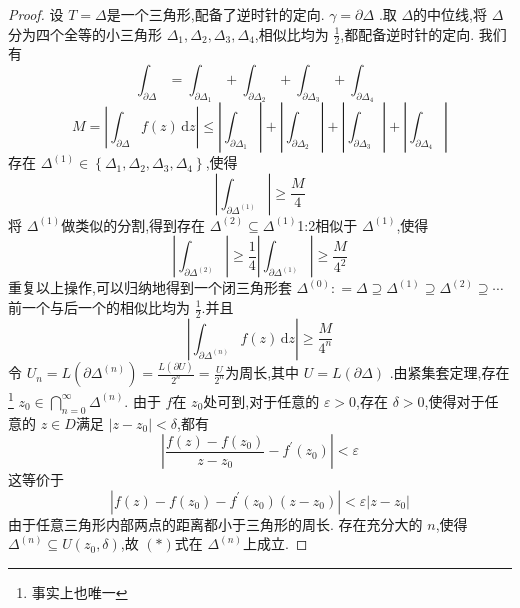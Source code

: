 \documentclass[../../复变函数.tex]{subfiles}
\begin{document}
\begin{proof}
    设 \(  T =  \Delta   \)是一个三角形,配备了逆时针的定向. \(   \gamma = \partial  \Delta   \)  .取 \(   \Delta   \)的中位线,将 \(   \Delta   \)分为四个全等的小三角形  \(   \Delta _1 , \Delta _2 , \Delta _3 , \Delta _4   \),相似比均为 \(  \frac{1}{2}  \),都配备逆时针的定向.    我们有 \[
    \int_{\partial  \Delta }= \int_{\partial  \Delta _1 }+ \int_{\partial  \Delta _2 }+ \int_{\partial  \Delta _3 }+ \int_{\partial  \Delta _4 }
    \] \[
    M =  \left| \int_{\partial  \Delta }f\left( z \right)\,\mathrm{d} z  \right|\le \left| \int_{\partial  \Delta _1 }\right|+ \left| \int_{\partial  \Delta _2 } \right|+ \left| \int_{\partial  \Delta _3 } \right|+ \left| \int_{\partial  \Delta _4 } \right|     
    \]存在 \(   \Delta ^{\left( 1 \right) } \in \left\{  \Delta _1 , \Delta _2 , \Delta _3 , \Delta _4  \right\}  \),使得 \[
    \left| \int_{\partial  \Delta ^{\left( 1 \right) }} \right|\ge \frac{M }{4 }  
    \]将 \(   \Delta ^{\left( 1 \right) }  \)做类似的分割,得到存在  \(   \Delta ^{\left( 2 \right) }\subseteq  \Delta ^{\left( 1 \right) }  \)1:2相似于 \(   \Delta ^{\left( 1 \right) }  \),使得 \[
    \left| \int_{\partial  \Delta ^{\left( 2 \right) }} \right|\ge \frac{1}{4} \left| \int_{\partial  \Delta ^{\left( 1 \right) }} \right|  \ge \frac{M }{4^{2} } 
    \]重复以上操作,可以归纳地得到一个闭三角形套 \(   \Delta ^{\left( 0 \right) }: =   \Delta \supseteq  \Delta ^{\left( 1 \right) }\supseteq  \Delta ^{\left( 2 \right) }\supseteq \cdots   \)     
    前一个与后一个的相似比均为 \(  \frac{1}{2}  \).并且 \[
    \left| \int_{\partial  \Delta ^{\left( n \right) }}f\left( z \right)  \,\mathrm{d} z\right|\ge \frac{M }{4^{n} }  
    \] 令 \(  U _{n}=  L\left( \partial  \Delta ^{\left( n \right) } \right)    =  \frac{L\left( \partial U \right)  }{2^{n} }=  \frac{U }{2^{n} }  \)为周长,其中 \(  U =  L\left( \partial  \Delta  \right)   \)  .由紧集套定理,存在\footnote{事实上也唯一} \(  z_0 \in \bigcap_{n = 0}  ^{\infty } \Delta ^{\left( n \right) } \).
    由于 \(  f  \)在 \(  z_0  \)处可到,对于任意的 \(   \varepsilon > 0  \),存在 \(   \delta >0  \),使得对于任意的 \(  z \in D  \)满足 \(  \left| z-z_0 \right|<  \delta     \),都有 \[
    \left| \frac{f\left( z \right)-f\left( z_0 \right)   }{z-z_0 }-f^{\prime} \left( z_0 \right)   \right|<  \varepsilon  
    \]     这等价于 \[
    \left| f\left( z \right)-f\left( z_0 \right)-f^{\prime} \left( z_0 \right)\left( z-z_0 \right)     \right|<  \varepsilon \left| z-z_0 \right|  \tag{*}
    \]  由于任意三角形内部两点的距离都小于三角形的周长.
    存在充分大的 \(  n  \),使得 \(   \Delta ^{\left( n \right) }\subseteq U\left( z_0, \delta  \right)   \),故 \(  \left( * \right)   \)式在 \(   \Delta ^{\left( n \right) }  \)上成立.

\end{proof}
\end{document}
